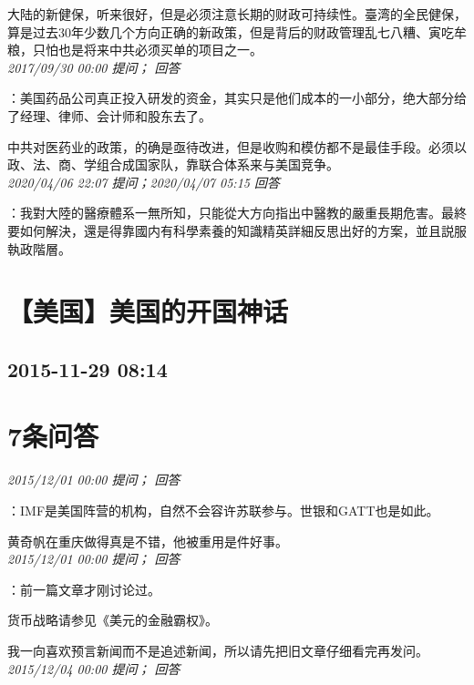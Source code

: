 \documentclass[twocolumn]{ctexart}
\begin{document}
大陆的新健保，听来很好，但是必须注意长期的财政可持续性。臺湾的全民健保，算是过去30年少数几个方向正确的新政策，但是背后的财政管理乱七八糟、寅吃牟粮，只怕也是将来中共必须买单的项目之一。\\

\textit{\hfill\noindent\small 2017/09/30 00:00 提问； 回答}

：美国药品公司真正投入研发的资金，其实只是他们成本的一小部分，绝大部分给了经理、律师、会计师和股东去了。

中共对医药业的政策，的确是亟待改进，但是收购和模仿都不是最佳手段。必须以政、法、商、学组合成国家队，靠联合体系来与美国竞争。\\

\textit{\hfill\noindent\small 2020/04/06 22:07 提问；2020/04/07 05:15 回答}

：我對大陸的醫療體系一無所知，只能從大方向指出中醫教的嚴重長期危害。最終要如何解決，還是得靠國内有科學素養的知識精英詳細反思出好的方案，並且説服執政階層。
\\


\section{【美国】美国的开国神话}
\subsection{2015-11-29 08:14}


\section{7条问答}

\textit{\hfill\noindent\small 2015/12/01 00:00 提问； 回答}

：IMF是美国阵营的机构，自然不会容许苏联参与。世银和GATT也是如此。

黄奇帆在重庆做得真是不错，他被重用是件好事。\\

\textit{\hfill\noindent\small 2015/12/01 00:00 提问； 回答}

：前一篇文章才刚讨论过。

货币战略请参见《美元的金融霸权》。

我一向喜欢预言新闻而不是追述新闻，所以请先把旧文章仔细看完再发问。\\

\textit{\hfill\noindent\small 2015/12/04 00:00 提问； 回答}
\end{document}
